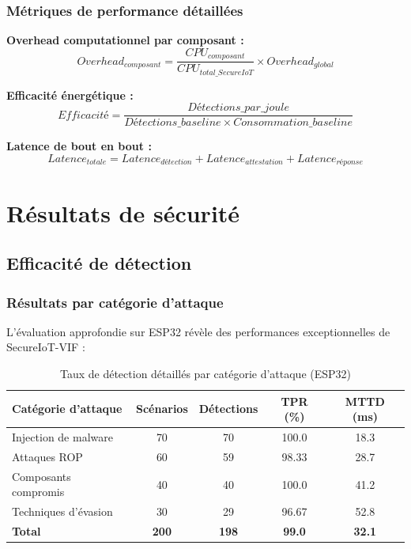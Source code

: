 \subsubsection{Métriques de performance détaillées}

\textbf{Overhead computationnel par composant :}
\begin{equation}
Overhead_{composant} = \frac{CPU_{composant}}{CPU_{total\_SecureIoT}} \times Overhead_{global}
\end{equation}

\textbf{Efficacité énergétique :}
\begin{equation}
Efficacité = \frac{Détections\_par\_joule}{Détections\_baseline \times Consommation\_baseline}
\end{equation}

\textbf{Latence de bout en bout :}
\begin{equation}
Latence_{totale} = Latence_{détection} + Latence_{attestation} + Latence_{réponse}
\end{equation}

\section{Résultats de sécurité}

\subsection{Efficacité de détection}

\subsubsection{Résultats par catégorie d'attaque}

L'évaluation approfondie sur ESP32 révèle des performances exceptionnelles de SecureIoT-VIF :

\begin{table}[h]
\centering
\caption{Taux de détection détaillés par catégorie d'attaque (ESP32)}
\label{tab:detection-rates-esp32}
\begin{tabular}{|l|c|c|c|c|}
\hline
\textbf{Catégorie d'attaque} & \textbf{Scénarios} & \textbf{Détections} & \textbf{TPR (\%)} & \textbf{MTTD (ms)} \\
\hline
Injection de malware & 70 & 70 & 100.0 & 18.3 \\
Attaques ROP & 60 & 59 & 98.33 & 28.7 \\
Composants compromis & 40 & 40 & 100.0 & 41.2 \\
Techniques d'évasion & 30 & 29 & 96.67 & 52.8 \\
\hline
\textbf{Total} & \textbf{200} & \textbf{198} & \textbf{99.0} & \textbf{32.1} \\
\hline
\end{tabular}
\end{table}

